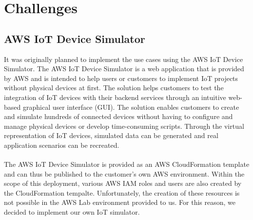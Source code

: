 \chapter{Challenges}

\section{AWS IoT Device Simulator}

It was originally planned to implement the use cases using the AWS IoT Device Simulator. The AWS IoT Device Simulator is a web application that is provided by AWS and is intended to help users or customers to implement IoT projects without physical devices at first. 
The solution helps customers to test the integration of IoT devices with their backend services through an intuitive web-based graphical user interface (GUI). The solution enables customers to create and simulate hundreds of connected devices without having to configure and manage physical devices or develop time-consuming scripts.
Through the virtual representation of IoT devices, simulated data can be generated and real application scenarios can be recreated.
\\
\\
The AWS IoT Device Simulator is provided as an AWS CloudFormation template and can thus be published to the customer's own AWS environment.
 Within the scope of this deployment, various AWS IAM roles and users are also created by the CloudFormation tempalte. Unfortunately, the creation of these resources is not possible in the AWS Lab environment provided to us. For this reason, we decided to implement our own IoT simulator.